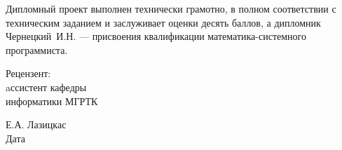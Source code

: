 \begin{singlespace}
{    Дипломный проект выполнен технически грамотно, в полном соответствии с техническим заданием и заслуживает оценки десять баллов, а дипломник \mbox{Чернецкий И.Н.} --- присвоения квалификации математика\hyp{}системного программиста.

    \vfill
    \noindent
    \begin{minipage}{0.4\textwidth}
      \begin{flushleft}
        Рецензент:\\
        aссистент кафедры\\
        информатики МГРТК
      \end{flushleft}
    \end{minipage}
    \begin{minipage}{0.55\textwidth}
      \begin{flushright}
      \underline{\hspace*{3cm}}\hspace*{0.5cm}\underline{\hspace*{2cm}} Е.А. Лазицкас\\
      Дата\hspace*{6.5cm}
      \end{flushright}
    \end{minipage}
  }
\end{singlespace}


\newpage
